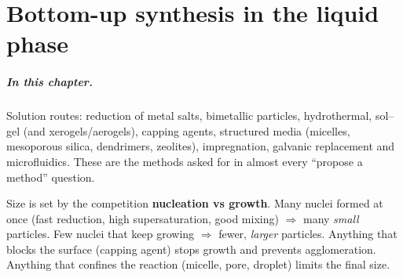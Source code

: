 \chapter{Bottom-up synthesis in the liquid phase}
\label{ch:liquid}

\paragraph{In this chapter.} Solution routes: reduction of metal salts, bimetallic particles, hydrothermal,
sol--gel (and xerogels/aerogels), capping agents, structured media (micelles, mesoporous silica, dendrimers,
zeolites), impregnation, galvanic replacement and microfluidics. These are the methods asked for in almost every
``propose a method'' question.

\begin{tipbox}
Size is set by the competition \textbf{nucleation vs growth}. Many nuclei formed at once (fast reduction, high
supersaturation, good mixing) $\Rightarrow$ many \emph{small} particles. Few nuclei that keep growing
$\Rightarrow$ fewer, \emph{larger} particles. Anything that blocks the surface (capping agent) stops growth and
prevents agglomeration. Anything that confines the reaction (micelle, pore, droplet) limits the final size.
\end{tipbox}

